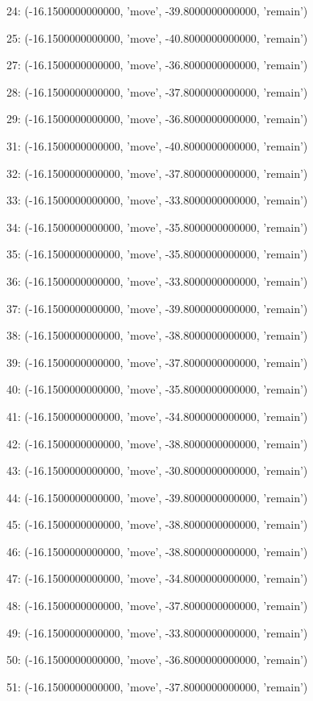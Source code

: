 24: (-16.1500000000000, 'move', -39.8000000000000, 'remain')


25: (-16.1500000000000, 'move', -40.8000000000000, 'remain')


27: (-16.1500000000000, 'move', -36.8000000000000, 'remain')


28: (-16.1500000000000, 'move', -37.8000000000000, 'remain')


29: (-16.1500000000000, 'move', -36.8000000000000, 'remain')


31: (-16.1500000000000, 'move', -40.8000000000000, 'remain')


32: (-16.1500000000000, 'move', -37.8000000000000, 'remain')


33: (-16.1500000000000, 'move', -33.8000000000000, 'remain')


34: (-16.1500000000000, 'move', -35.8000000000000, 'remain')


35: (-16.1500000000000, 'move', -35.8000000000000, 'remain')


36: (-16.1500000000000, 'move', -33.8000000000000, 'remain')


37: (-16.1500000000000, 'move', -39.8000000000000, 'remain')


38: (-16.1500000000000, 'move', -38.8000000000000, 'remain')


39: (-16.1500000000000, 'move', -37.8000000000000, 'remain')


40: (-16.1500000000000, 'move', -35.8000000000000, 'remain')


41: (-16.1500000000000, 'move', -34.8000000000000, 'remain')


42: (-16.1500000000000, 'move', -38.8000000000000, 'remain')


43: (-16.1500000000000, 'move', -30.8000000000000, 'remain')


44: (-16.1500000000000, 'move', -39.8000000000000, 'remain')


45: (-16.1500000000000, 'move', -38.8000000000000, 'remain')


46: (-16.1500000000000, 'move', -38.8000000000000, 'remain')


47: (-16.1500000000000, 'move', -34.8000000000000, 'remain')


48: (-16.1500000000000, 'move', -37.8000000000000, 'remain')


49: (-16.1500000000000, 'move', -33.8000000000000, 'remain')


50: (-16.1500000000000, 'move', -36.8000000000000, 'remain')


51: (-16.1500000000000, 'move', -37.8000000000000, 'remain')


